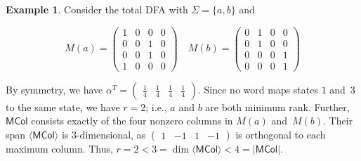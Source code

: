 \documentclass[11pt,a4paper]{amsart}
\newcommand{\spn}[1]{\mathord{\langle #1 \rangle}}
\newcommand{\MCol}{\mathsf{MCol}}
\theoremstyle{plain}
\theoremstyle{definition}
\newtheorem{exa}[thm]{Example}
\theoremstyle{defC}
\theoremstyle{thmC}
\theoremstyle{plain}
\numberwithin{equation}{section}
\begin{document}
\begin{exa} \label{ex:snap1}
Consider the total DFA with $\Sigma = \{a,b\}$ and
\begin{figure}[H]
    \centering
    \begin{subfigure}[c]{0.65\textwidth} \centering
\[
M(a) = \begin{pmatrix} 1 & 0 & 0 & 0 \\ 0 & 0 & 1 & 0 \\ 0 & 0 & 1 & 0 \\ 1 & 0 & 0 & 0 \end{pmatrix} \quad
M(b) = \begin{pmatrix} 0 & 1 & 0 & 0 \\ 0 & 1 & 0 & 0 \\ 0 & 0 & 0 & 1 \\ 0 & 0 & 0 & 1 \end{pmatrix}\]
\end{subfigure}
\begin{subfigure}[c]{0.30\textwidth} \centering
{}
\end{subfigure}
\end{figure}

\noindent
By symmetry, we have $\alpha^T = \begin{pmatrix} \frac14 & \frac14 & \frac14 & \frac14 \end{pmatrix}$.
Since no word maps states $1$ and~$3$ to the same state, we have $r=2$; i.e., $a$ and $b$ are both minimum rank.
Further, $\MCol$ consists exactly of the four nonzero columns in $M(a)$ and~$M(b)$. 
Their span $\spn{\MCol}$ is $3$-dimensional, as $\begin{pmatrix}1 & -1 & 1 & -1\end{pmatrix}$ is orthogonal to each maximum column.
Thus, $r = 2 < 3 = \dim \spn{\MCol} < 4 = |\MCol|$.
\end{exa}
\end{document}
